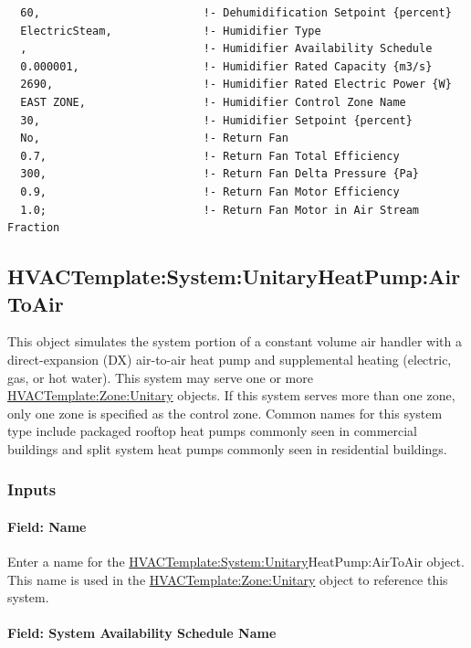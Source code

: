 \begin{lstlisting}
  60,                         !- Dehumidification Setpoint {percent}
  ElectricSteam,              !- Humidifier Type
  ,                           !- Humidifier Availability Schedule
  0.000001,                   !- Humidifier Rated Capacity {m3/s}
  2690,                       !- Humidifier Rated Electric Power {W}
  EAST ZONE,                  !- Humidifier Control Zone Name
  30,                         !- Humidifier Setpoint {percent}
  No,                         !- Return Fan
  0.7,                        !- Return Fan Total Efficiency
  300,                        !- Return Fan Delta Pressure {Pa}
  0.9,                        !- Return Fan Motor Efficiency
  1.0;                        !- Return Fan Motor in Air Stream Fraction
\end{lstlisting}

\subsection{HVACTemplate:System:UnitaryHeatPump:AirToAir}\label{hvactemplatesystemunitaryheatpumpairtoair}

This object simulates the system portion of a constant volume air handler with a direct-expansion (DX) air-to-air heat pump and supplemental heating (electric, gas, or hot water). This system may serve one or more \hyperref[hvactemplatezoneunitary]{HVACTemplate:Zone:Unitary} objects. If this system serves more than one zone, only one zone is specified as the control zone. Common names for this system type include packaged rooftop heat pumps commonly seen in commercial buildings and split system heat pumps commonly seen in residential buildings.

\subsubsection{Inputs}\label{inputs-16-004}

\paragraph{Field: Name}\label{field-name-3-016}

Enter a name for the \hyperref[hvactemplatesystemunitary]{HVACTemplate:System:Unitary}HeatPump:AirToAir object. This name is used in the \hyperref[hvactemplatezoneunitary]{HVACTemplate:Zone:Unitary} object to reference this system.

\paragraph{Field: System Availability Schedule Name}\label{field-system-availability-schedule-name-8}


